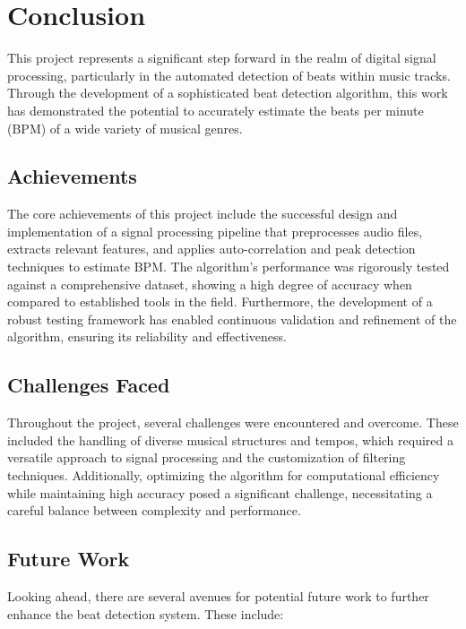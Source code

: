 \section{Conclusion}

This project represents a significant step forward in the realm of digital signal processing, particularly in the automated detection of beats within music tracks. Through the development of a sophisticated beat detection algorithm, this work has demonstrated the potential to accurately estimate the beats per minute (BPM) of a wide variety of musical genres.

\subsection{Achievements}

The core achievements of this project include the successful design and implementation of a signal processing pipeline that preprocesses audio files, extracts relevant features, and applies auto-correlation and peak detection techniques to estimate BPM. The algorithm's performance was rigorously tested against a comprehensive dataset, showing a high degree of accuracy when compared to established tools in the field. Furthermore, the development of a robust testing framework has enabled continuous validation and refinement of the algorithm, ensuring its reliability and effectiveness.

\subsection{Challenges Faced}

Throughout the project, several challenges were encountered and overcome. These included the handling of diverse musical structures and tempos, which required a versatile approach to signal processing and the customization of filtering techniques. Additionally, optimizing the algorithm for computational efficiency while maintaining high accuracy posed a significant challenge, necessitating a careful balance between complexity and performance.

\subsection{Future Work}

Looking ahead, there are several avenues for potential future work to further enhance the beat detection system. These include:

